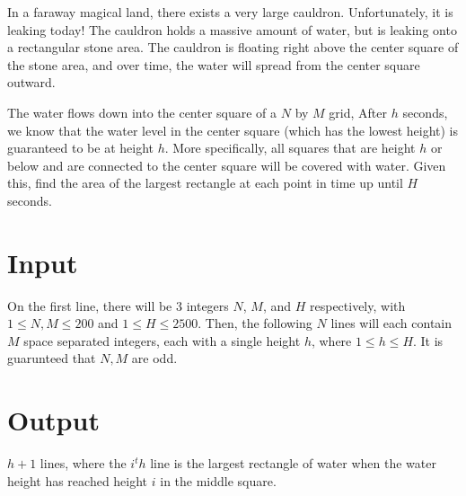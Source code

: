 
In a faraway magical land, there exists a very large cauldron. Unfortunately, it is leaking today! The cauldron holds a massive amount of water, but is leaking onto a rectangular stone area. The cauldron is floating right above the center square of the stone area, and over time, the water will spread from the center square outward.

The water flows down into the center square of a $N$ by $M$ grid, After $h$ seconds, we know that the water level in the center square (which has the lowest height) is guaranteed to be at height $h$. More specifically, all squares that are height $h$ or below and are connected to the center square will be covered with water. Given this, find the area of the largest rectangle at each point in time up until $H$ seconds.

\section*{Input}
On the first line, there will be 3 integers $N$, $M$, and $H$ respectively, with $1 \le N, M \le 200$ and $1 \le H \le 2500$. Then, the following $N$ lines will each contain $M$ space separated integers, each with a single height $h$, where $1 \le h \le H$. It is guarunteed that $N, M$ are odd.

\section*{Output}
$h + 1$ lines, where the $i^th$ line is the largest rectangle of water when the water height has reached height $i$ in the middle square. 
